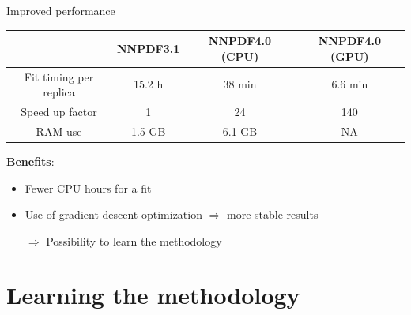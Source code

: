 \documentclass[aspectratio=169,10pt]{beamer}
\begin{document}
\begin{frame}{Improved performance}
\begin{table}
   \renewcommand{\arraystretch}{1.50}
	\centering
	\begin{tabular}{c | c | c | c} \toprule
	  & NNPDF3.1  & NNPDF4.0 (CPU) & NNPDF4.0  (GPU) \\
          \midrule
	  Fit timing per replica    & 15.2 h        & 38 min        & 6.6 min \\ \hline
           Speed up factor    & 1        &  24      & 140 \\ \hline
	  RAM use &  1.5 GB          &  6.1 GB                 & NA  \\ \bottomrule
	\end{tabular}
\end{table}
\vspace*{1em}
\textbf{Benefits}:
    \begin{itemize}
        \item Fewer CPU hours for a fit
        \item Use of gradient descent optimization $\Rightarrow$ more stable results\\
        \vspace*{1em}
        \item[$\Rightarrow$] Possibility to learn the methodology
    \end{itemize}
    
\end{frame}

\section*{Learning the methodology}
\end{document}
